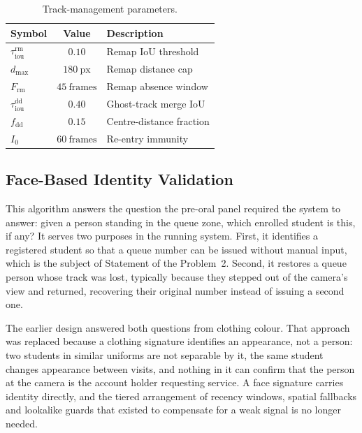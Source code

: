 \begin{table}[H]
\centering
\caption{Track-management parameters.}
\label{tab:dedup-params}
\begin{tabular}{lcl}
\hline
Symbol & Value & Description \\
\hline
$\tau_{\mathrm{iou}}^{\mathrm{rm}}$ & $0.10$ & Remap IoU threshold \\
$d_{\max}$                          & $180\ \mathrm{px}$ & Remap distance cap \\
$F_{\mathrm{rm}}$                   & $45\ \text{frames}$ & Remap absence window \\
$\tau_{\mathrm{iou}}^{\mathrm{dd}}$ & $0.40$ & Ghost-track merge IoU \\
$f_{\mathrm{dd}}$                   & $0.15$ & Centre-distance fraction \\
$I_0$                               & $60\ \text{frames}$ & Re-entry immunity \\
\hline
\end{tabular}
\end{table}


\subsection{Face-Based Identity Validation}
\label{subsec:reid}

This algorithm answers the question the pre-oral panel required the system
to answer: given a person standing in the queue zone, which enrolled
student is this, if any? It serves two purposes in the running system.
First, it identifies a registered student so that a queue number can be
issued without manual input, which is the subject of
Statement of the Problem~2. Second, it restores a queue person whose
track was lost, typically because they stepped out of the camera's view
and returned, recovering their original number instead of issuing a
second one.

The earlier design answered both questions from clothing colour. That
approach was replaced because a clothing signature identifies an
appearance, not a person: two students in similar uniforms are not
separable by it, the same student changes appearance between visits, and
nothing in it can confirm that the person at the camera is the account
holder requesting service. A face signature carries identity directly, and
the tiered arrangement of recency windows, spatial fallbacks and lookalike
guards that existed to compensate for a weak signal is no longer needed.

